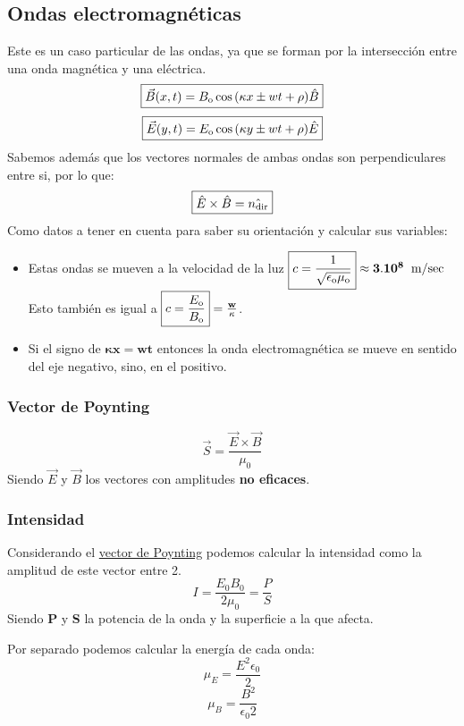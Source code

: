 \subsection{Ondas electromagnéticas}
\noindent Este es un caso particular de las ondas, ya que se forman por la intersección entre una onda magnética y una eléctrica.
\[
        \boxed{\vec{B}(x,t) = B_{\textnormal{o}} \cos{(\kappa x \pm  wt+\rho)} \hat{B}}
\]\[
        \boxed{\vec{E}(y,t) = E_{\textnormal{o}} \cos{(\kappa y \pm  wt+\rho)} \hat{E}}
\]
\noindent Sabemos además que los vectores normales de ambas ondas son perpendiculares entre si, por lo que:
\[
        \mathbf{\boxed{\hat{E} \times \hat{B} = \hat{n_{\textnormal{dir}}}}}
\]
\noindent Como datos a tener en cuenta para saber su orientación y calcular sus variables:
\begin{itemize}
        \item Estas ondas se mueven a la velocidad de la luz \(\mathbf{\boxed{c = \frac{1}{\sqrt{\epsilon_{\textnormal{o}}\mu_{\textnormal{o}}}}}\approx 3.10^8\hspace{2mm}\textnormal{m/sec}}\) Esto también es igual a \(\mathbf{\boxed{c=\frac{E_{\textnormal{o}}}{B_{\textnormal{o}}}} = \frac{w}{\kappa}}\).
        \item Si el signo de \(\boxed{\mathbf{ \kappa x } = \mathbf{wt}}\) entonces la onda electromagnética se mueve en sentido del eje negativo, sino, en el positivo.
\end{itemize}
\subsubsection{Vector de Poynting}
\[
        \boxed{\vec{S} = \frac{\vec{E}\times \vec{B}}{\mu_0}}
\]
\noindent Siendo \(\vec{E}\) y \(\vec{B}\) los vectores con amplitudes \textbf{no eficaces}.
\subsubsection{Intensidad}
\noindent Considerando el \underline{vector de Poynting} podemos calcular la intensidad como la amplitud de este vector entre 2.
\[
        \boxed{I = \frac{E_0 B_0}{2\mu_0} = \frac{P}{S}}
\]
\noindent Siendo \textbf{P} y \textbf{S} la potencia de la onda y la superficie a la que afecta.
\par \noindent Por separado podemos calcular la energía de cada onda:
\[
        \boxed{\mu_E = \frac{E^2\epsilon_0}{2}}
\]
\[
        \boxed{\mu_B = \frac{B^2}{\epsilon_0 2}}
\]